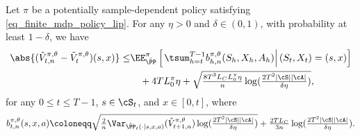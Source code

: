 \documentclass[9pt]{article}
\numberwithin{equation}{section}
\begin{document}
\begin{lemma}\label{lemma_fin_mdp_pol_opt_bern_rad}
    Let $\pi$ be a potentially sample-dependent policy  satisfying \eqref{eq_finite_mdp_policy_lip}. For any $\eta > 0$ and $\delta \in (0,1)$, with probability at least $1-\delta$, we have 
    \begin{align}
        \abs{ (\hat{V}_{t,n}^{\pi, \theta} - \tilde{V}_t^{\pi, \theta})(s,x)} \leq & \EE_{\tilde{\PP}}^\pi \left[\left. \tsum_{h=t}^{T-1}b_{h,n}^{\pi, \theta}(S_h, X_h, A_h)\right| (S_t, X_t) = (s,x) \right] \nonumber \\
        & ~~~  + 4TL_{0}^\pi \eta + \sqrt{\tfrac{8T^3L_C L_{0}^\pi \eta}{n} \log(\tfrac{2T^2 |\cS| |\cA|}{\delta \eta})},  
            \end{align}
   for any $0 \leq t \leq T-1$, $s \in \cS_t$, and $ x \in [0,t]$, 
    where
 \begin{align}\label{eq_def_local_bernstein}
  b_{t,n}^{\pi, \theta}(s,x,a) \coloneqq \sqrt{\tfrac{2}{n}\Var_{\tilde{\PP}_t(\cdot|s,x,a)} (\hat{V}_{t+1,n}^{\pi, \theta}) \log(\tfrac{2T^2 |\cS| |\cA|}{\delta \eta})} + \tfrac{2T L_C}{3n} \log(\tfrac{2T^2 |\cS| |\cA|}{\delta \eta}).
  \end{align}
\end{lemma}
\end{document}
